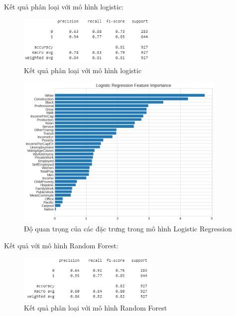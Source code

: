 \documentclass[14pt, a4paper]{article}
\numberwithin{equation}{section}
\numberwithin{figure}{section}
\numberwithin{dl}{section}
\numberwithin{md}{section}
\numberwithin{bd}{section}
\numberwithin{dn}{section}
\numberwithin{hq}{section}
\begin{document}
    Kết quả phân loại với mô hình logistic:

    \begin{figure}[h!]
        \centering
        \includegraphics[width=0.6\textwidth]{figures/Logistic_Regression_Report.png}
        \caption{Kết quả phân loại với mô hình logistic}
    \end{figure}

    \begin{figure}[h!]
        \centering
        \includegraphics[width=0.9\textwidth]{figures/Logistic_Regression_Feature_Importance.png}
        \caption{Độ quan trọng của các đặc trưng trong mô hình Logistic Regression}
    \end{figure}

    Kết quả với mô hình Random Forest:

    \begin{figure}[h!]
        \centering
        \includegraphics[width=0.6\textwidth]{figures/Random_Forest_Feature_Report.png}
        \caption{Kết quả phân loại với mô hình Random Forest}
    \end{figure}
\end{document}

